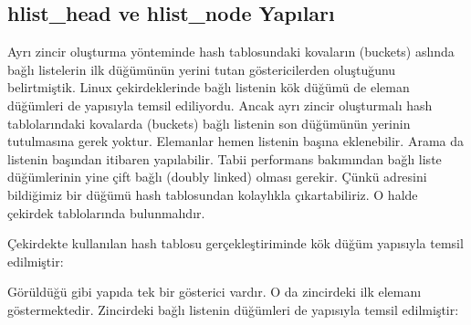 \documentclass[a4paper,10pt,turkish]{sphinxmanual}
\begin{document}
\subsection{hlist\_head ve hlist\_node Yapıları}
\label{\detokenize{kernellinkedlistandhashtable:hlist-head-ve-hlist-node-yapilari}}
\sphinxAtStartPar
Ayrı zincir oluşturma yönteminde hash tablosundaki kovaların (buckets) aslında bağlı
listelerin ilk düğümünün yerini tutan göstericilerden oluştuğunu belirtmiştik. Linux
çekirdeklerinde bağlı listenin kök düğümü de eleman düğümleri de  yapısıyla
temsil ediliyordu. Ancak ayrı zincir oluşturmalı hash tablolarındaki kovalarda (buckets)
bağlı listenin son düğümünün yerinin tutulmasına gerek yoktur. Elemanlar hemen listenin
başına eklenebilir. Arama da listenin başından itibaren yapılabilir. Tabii performans
bakımından bağlı liste düğümlerinin yine çift bağlı (doubly linked) olması gerekir. Çünkü
adresini bildiğimiz bir düğümü hash tablosundan kolaylıkla çıkartabiliriz. O halde çekirdek
tablolarında 
bulunmalıdır.

\sphinxAtStartPar
Çekirdekte kullanılan hash tablosu gerçekleştiriminde kök düğüm  yapısıyla
temsil edilmiştir:

\begin{sphinxVerbatim}[commandchars=\\\{\}]
\end{sphinxVerbatim}

\sphinxAtStartPar
Görüldüğü gibi yapıda tek bir gösterici vardır. O da zincirdeki ilk elemanı göstermektedir.
Zincirdeki bağlı listenin düğümleri de  yapısıyla temsil edilmiştir:

\begin{sphinxVerbatim}[commandchars=\\\{\}]
\end{sphinxVerbatim}
\end{document}
